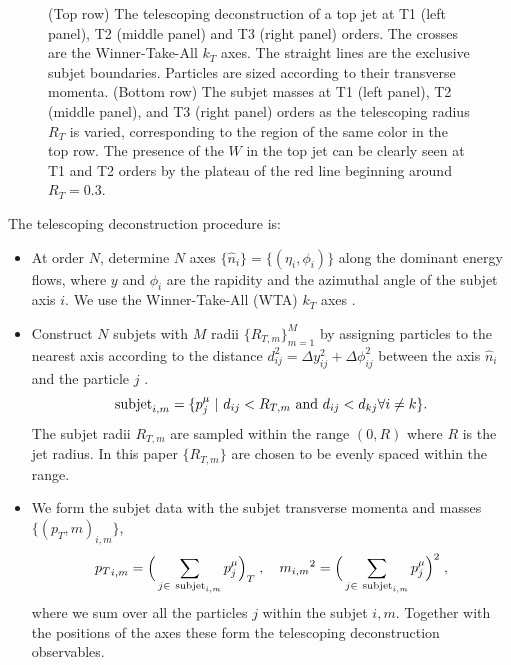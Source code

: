 \documentclass[notoc]{JHEP3}
\begin{document}
\begin{figure}[t]
\caption{\label{fig:tjet}(Top row) The telescoping deconstruction of a top jet at T1 (left panel), T2 (middle panel) and T3 (right panel) orders. The crosses are the Winner-Take-All $k_T$ axes. The straight lines are the exclusive subjet boundaries. Particles are sized according to their transverse momenta. (Bottom row) The subjet masses at T1 (left panel), T2 (middle panel), and T3 (right panel) orders as the telescoping radius $R_T$ is varied, corresponding to the region of the same color in the top row. The presence of the $W$ in the top jet can be clearly seen at T1 and T2 orders by the plateau of the red line beginning around $R_T=0.3$.}
\end{figure}


The telescoping deconstruction procedure is:
\begin{itemize}
        \item At order $N$, determine $N$ axes $\{\hat n_i\}=\{(\eta_i,\phi_i)\}$ along the dominant energy flows, where $y$ and $\phi_i$ are the rapidity and the azimuthal angle of the subjet axis $i$. We use the Winner-Take-All (WTA) $k_T$ axes \cite{Bertolini:2013iqa}.
        \item Construct $N$ subjets with $M$ radii $\{R_{T,m}\}^M_{m=1}$ by assigning particles to the nearest axis according to the distance $d^2_{ij} = \Delta y_{ij}^2+\Delta \phi_{ij}^2$ between the axis $\hat n_i$ and the particle $j$ \cite{Stewart:2010tn,Chien:2013kca,Stewart:2015waa,Thaler:2015xaa}.
            \begin{equation}
                {\rm subjet}_{i,m} = \{p^\mu_j~|~d_{ij}<R_{T,m}~{\rm and}~d_{ij}<d_{kj} \forall i\neq k\}.
            \end{equation}
            The subjet radii ${R_{T,m}}$ are sampled within the range $(0,R)$ where $R$ is the jet radius. In this paper $\{R_{T,m}\}$ are chosen to be evenly spaced within the range.
        \item We form the subjet data with the subjet transverse momenta and masses $\{(p_T,m)_{i,m}\}$,
            \begin{equation}
                {p_T}_{i,m}=\Big(\sum_{j\in~{\rm subjet}_{i,m}}p^\mu_j\Big)_T\;,~~~{m_{i,m}}^2=\Big(\sum_{j\in~{\rm subjet}_{i,m}}p^\mu_j\Big)^2\;,
            \end{equation}
            where we sum over all the particles $j$ within the subjet $i,m$. Together with the positions of the axes these form the telescoping deconstruction observables.
    \end{itemize}
\end{document}
